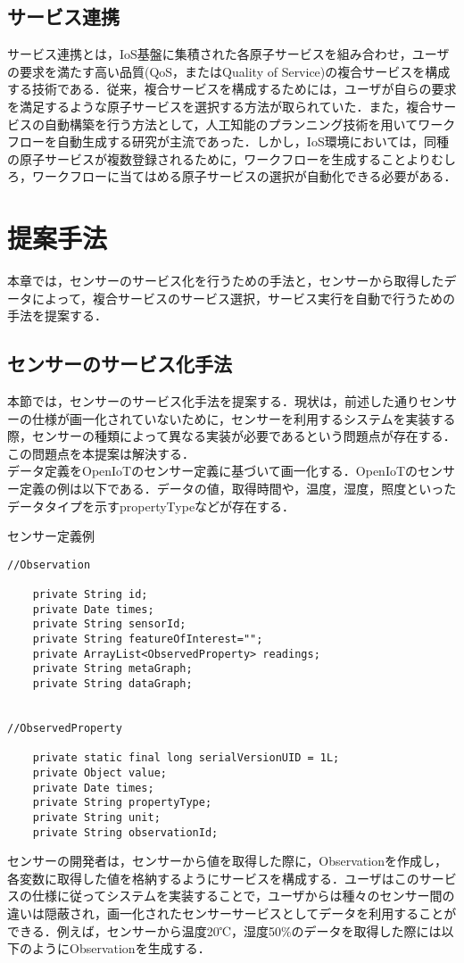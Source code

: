 \documentclass{kuisthesis}			%
\begin{document}
\subsection{サービス連携}
サービス連携とは，IoS基盤に集積された各原子サービスを組み合わせ，ユーザの要求を満たす高い品質(QoS，またはQuality of Service)の複合サービスを構成する技術である．従来，複合サービスを構成するためには，ユーザが自らの要求を満足するような原子サービスを選択する方法が取られていた．また，複合サービスの自動構築を行う方法として，人工知能のプランニング技術を用いてワークフローを自動生成する研究が主流であった．しかし，IoS環境においては，同種の原子サービスが複数登録されるために，ワークフローを生成することよりむしろ，ワークフローに当てはめる原子サービスの選択が自動化できる必要がある．

\section{提案手法}
本章では，センサーのサービス化を行うための手法と，センサーから取得したデータによって，複合サービスのサービス選択，サービス実行を自動で行うための手法を提案する．

\subsection{センサーのサービス化手法}
本節では，センサーのサービス化手法を提案する．現状は，前述した通りセンサーの仕様が画一化されていないために，センサーを利用するシステムを実装する際，センサーの種類によって異なる実装が必要であるという問題点が存在する．この問題点を本提案は解決する．
\\
データ定義をOpenIoTのセンサー定義に基づいて画一化する．OpenIoTのセンサー定義の例は以下である．データの値，取得時間や，温度，湿度，照度といったデータタイプを示すpropertyTypeなどが存在する．
\begin{itembox}[l]{センサー定義例}
\begin{verbatim}
//Observation

	private String id;	
	private Date times;	
	private String sensorId;
	private String featureOfInterest=""; 
	private ArrayList<ObservedProperty> readings;
	private String metaGraph;
	private String dataGraph;
	
	
//ObservedProperty

	private static final long serialVersionUID = 1L;
	private Object value;
	private Date times;
	private String propertyType;
	private String unit;
	private String observationId;
\end{verbatim}
\end{itembox}
センサーの開発者は，センサーから値を取得した際に，Observationを作成し，各変数に取得した値を格納するようにサービスを構成する．ユーザはこのサービスの仕様に従ってシステムを実装することで，ユーザからは種々のセンサー間の違いは隠蔽され，画一化されたセンサーサービスとしてデータを利用することができる．例えば，センサーから温度20℃，湿度50\%のデータを取得した際には以下のようにObservationを生成する．\\
\end{document}
